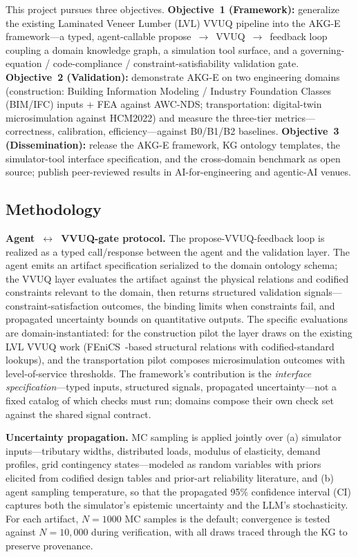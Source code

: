 \documentclass[conference, 10pt]{IEEEtran}
\begin{document}
This project pursues three objectives. \textbf{Objective~1 (Framework):} generalize the existing Laminated Veneer Lumber (LVL) VVUQ pipeline into the AKG-E framework---a typed, agent-callable propose~$\to$~VVUQ~$\to$~feedback loop coupling a domain knowledge graph, a simulation tool surface, and a governing-equation / code-compliance / constraint-satisfiability validation gate. \textbf{Objective~2 (Validation):} demonstrate AKG-E on two engineering domains (construction: Building Information Modeling / Industry Foundation Classes (BIM/IFC) inputs + FEA against AWC-NDS; transportation: digital-twin microsimulation against HCM2022) and measure the three-tier metrics---correctness, calibration, efficiency---against B0/B1/B2 baselines. \textbf{Objective~3 (Dissemination):} release the AKG-E framework, KG ontology templates, the simulator-tool interface specification, and the cross-domain benchmark as open source; publish peer-reviewed results in AI-for-engineering and agentic-AI venues.

\subsection{Methodology}

\textbf{Agent~$\leftrightarrow$~VVUQ-gate protocol.} The propose-VVUQ-feedback loop is realized as a typed call/response between the agent and the validation layer. The agent emits an artifact specification serialized to the domain ontology schema; the VVUQ layer evaluates the artifact against the physical relations and codified constraints relevant to the domain, then returns structured validation signals---constraint-satisfaction outcomes, the binding limits when constraints fail, and propagated uncertainty bounds on quantitative outputs. The specific evaluations are domain-instantiated: for the construction pilot the layer draws on the existing LVL VVUQ work (FEniCS~\cite{Logg2012FEniCS}-based structural relations with codified-standard lookups), and the transportation pilot composes microsimulation outcomes with level-of-service thresholds. The framework's contribution is the \textit{interface specification}---typed inputs, structured signals, propagated uncertainty---not a fixed catalog of which checks must run; domains compose their own check set against the shared signal contract.

\textbf{Uncertainty propagation.} MC sampling is applied jointly over (a) simulator inputs---tributary widths, distributed loads, modulus of elasticity, demand profiles, grid contingency states---modeled as random variables with priors elicited from codified design tables and prior-art reliability literature, and (b) agent sampling temperature, so that the propagated 95\% confidence interval (CI) captures both the simulator's epistemic uncertainty and the LLM's stochasticity. For each artifact, $N=1000$ MC samples is the default; convergence is tested against $N=10{,}000$ during verification, with all draws traced through the KG to preserve provenance.
\end{document}
